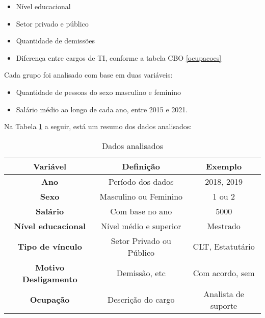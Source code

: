 \begin{itemize}
	\item Nível educacional 	      	      	      	      	      
	\item Setor privado e público	      	      	      	      	     
	\item Quantidade de demissões    	      	      	      	     
	\item Diferença entre cargos de TI, conforme a tabela CBO \ref{ocupacoes}    	      	      	     
\end{itemize}
	      	      	    
Cada grupo foi analisado com base em duas variáveis:

\begin{itemize}
	\item Quantidade de pessoas do sexo masculino e feminino	      	      	      	      	      
	\item Salário médio ao longo de cada ano, entre 2015 e 2021.	    
\end{itemize}
	      	      	      
Na Tabela \ref{vars} a seguir, está um resumo dos dados analisados:     

\begin{table}[htbp]
	\caption{Dados analisados}
	\begin{center}
		\begin{tabular}{|c|c|c|}
			\hline
			\textbf{Variável}           & \textbf{Definição}      & \textbf{Exemplo}    \\ 
			\hline 
			\textbf{Ano}                 & Período dos dados        & 2018, 2019          \\
			\hline
			\textbf{Sexo}                & Masculino ou Feminino     & 1 ou 2              \\
			\hline
			\textbf{Salário}            & Com base no ano           & 5000                \\
			\hline 
			\textbf{Nível educacional}  & Nível médio e superior  & Mestrado            \\
			\hline 
			\textbf{Tipo de vínculo}    & Setor Privado ou Público & CLT, Estatutário   \\
			\hline 
			\textbf{Motivo Desligamento} & Demissão, etc            & Com acordo, sem     \\
			\hline
			\textbf{Ocupação}          & Descrição do cargo      & Analista de suporte \\
			\hline 
		\end{tabular}
		\label{vars}
	\end{center} 
\end{table}      	      

